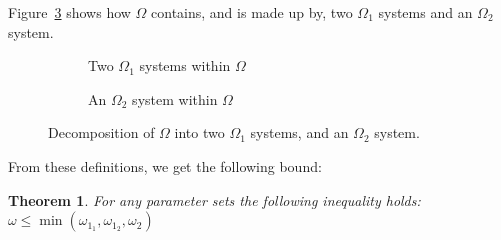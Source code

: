 \documentclass{article}
\newtheorem{theorem}{Theorem}
\numberwithin{equation}{section}
\begin{document}
Figure~\ref{fig:decomposeqnet} shows how $\Omega$ contains, and is made up by,
two $\Omega_1$ systems and an $\Omega_2$ system.

\begin{figure}[!htbp]
\begin{center}
\begin{subfigure}[b]{0.85\textwidth}
  
  \caption{Two $\Omega_1$ systems within $\Omega$}
  \label{fig:omega1swithinomega}
\end{subfigure}
\end{center}
\vspace{12mm}
\begin{center}
\begin{subfigure}[b]{0.85\textwidth}
  
  \caption{An $\Omega_2$ system within $\Omega$}
  \label{fig:omega2withinomega}
\end{subfigure}
\end{center}
\caption{Decomposition of $\Omega$ into two $\Omega_1$ systems, and an
$\Omega_2$ system.}
\label{fig:decomposeqnet}
\end{figure}


From these definitions, we get the following bound:

\begin{theorem}\label{thrm:bound}
For any parameter sets the following inequality holds:
$\omega \leq \min(\omega_{1_1}, \omega_{1_2}, \omega_2)$
\end{theorem}
\end{document}
